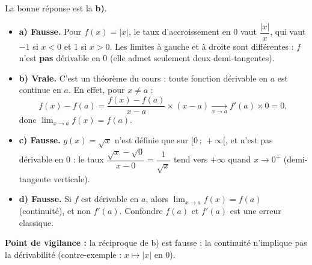 \documentclass[11pt]{article}
\begin{document}
\begin{corrige}
La bonne réponse est la \textbf{b)}.

\begin{itemize}
    \item \textbf{a) Fausse.} Pour $f(x)=|x|$, le taux d'accroissement en $0$ vaut $\dfrac{|x|}{x}$, qui vaut $-1$ si $x<0$ et $1$ si $x>0$. Les limites à gauche et à droite sont différentes : $f$ n'est \textbf{pas} dérivable en $0$ (elle admet seulement deux demi-tangentes).
    \item \textbf{b) Vraie.} C'est un théorème du cours : toute fonction dérivable en $a$ est continue en $a$. En effet, pour $x\neq a$ :
    \[
    f(x)-f(a)=\frac{f(x)-f(a)}{x-a}\times(x-a)\xrightarrow[x\to a]{} f'(a)\times 0 = 0,
    \]
    donc $\lim_{x\to a}f(x)=f(a)$.
    \item \textbf{c) Fausse.} $g(x)=\sqrt{x}$ n'est définie que sur $[0\,;\,+\infty[$, et n'est pas dérivable en $0$ : le taux $\dfrac{\sqrt{x}-\sqrt{0}}{x-0}=\dfrac{1}{\sqrt{x}}$ tend vers $+\infty$ quand $x\to 0^+$ (demi-tangente verticale).
    \item \textbf{d) Fausse.} Si $f$ est dérivable en $a$, alors $\lim_{x\to a}f(x)=f(a)$ (continuité), et non $f'(a)$. Confondre $f(a)$ et $f'(a)$ est une erreur classique.
\end{itemize}

\textbf{Point de vigilance :} la réciproque de b) est fausse : la continuité n'implique pas la dérivabilité (contre-exemple : $x\mapsto |x|$ en $0$).
\end{corrige}
\end{document}
